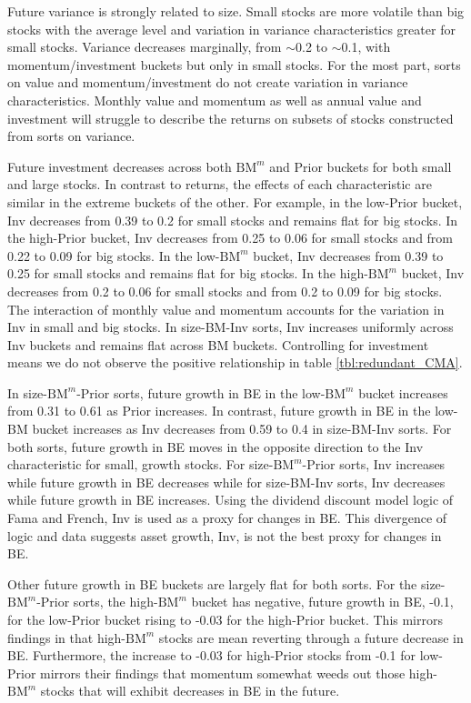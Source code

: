 Future variance is strongly related to size. Small stocks are more volatile
than big stocks with the average level and variation in variance
characteristics greater for small stocks. Variance decreases marginally, from
$\sim$0.2 to $\sim$0.1, with momentum/investment buckets but only in small
stocks. For the most part, sorts on value and momentum/investment do not create
variation in variance characteristics. Monthly value and momentum as well as
annual value and investment will struggle to describe the returns on subsets of
stocks constructed from sorts on variance.

Future investment decreases across both $\text{BM}^m$ and Prior buckets for
both small and large stocks. In contrast to returns, the effects of each
characteristic are similar in the extreme buckets of the other. For example, in
the low-Prior bucket, Inv decreases from 0.39 to 0.2 for small stocks and
remains flat for big stocks. In the high-Prior bucket, Inv decreases from 0.25
to 0.06 for small stocks and from 0.22 to 0.09 for big stocks. In the
low-$\text{BM}^m$ bucket, Inv decreases from 0.39 to 0.25 for small stocks and
remains flat for big stocks. In the high-$\text{BM}^m$ bucket, Inv decreases
from 0.2 to 0.06 for small stocks and from 0.2 to 0.09 for big stocks. The
interaction of monthly value and momentum accounts for the variation in Inv in
small and big stocks. In size-BM-Inv sorts, Inv increases uniformly across Inv
buckets and remains flat across BM buckets. Controlling for investment means we
do not observe the positive relationship in table \ref{tbl:redundant_CMA}.

In size-$\text{BM}^m$-Prior sorts, future growth in BE in the low-$\text{BM}^m$
bucket increases from 0.31 to 0.61 as Prior increases. In contrast, future
growth in BE in the low-BM bucket increases as Inv decreases from 0.59 to 0.4
in size-BM-Inv sorts. For both sorts, future growth in BE moves in the opposite
direction to the Inv characteristic for small, growth stocks.
For size-$\text{BM}^m$-Prior sorts, Inv
increases while future growth in BE decreases while for size-BM-Inv sorts, Inv
decreases while future growth in BE increases. Using the dividend discount
model logic of Fama and French, Inv is used as a proxy for changes in BE. This
divergence of logic and data suggests asset growth, Inv, is not the best proxy
for changes in BE.

Other future growth in BE buckets are largely flat for both sorts. For the
size-$\text{BM}^m$-Prior sorts, the high-$\text{BM}^m$ bucket has negative,
future growth in BE, -0.1, for the low-Prior bucket rising to -0.03 for the
high-Prior bucket. This mirrors findings in \textcite{kok2017facts} that
high-$\text{BM}^m$ stocks are mean reverting through a future decrease in BE.
Furthermore, the increase to -0.03 for high-Prior stocks from -0.1
for low-Prior mirrors their findings that momentum somewhat weeds out
those high-$\text{BM}^m$ stocks that will exhibit decreases in BE in the
future.

